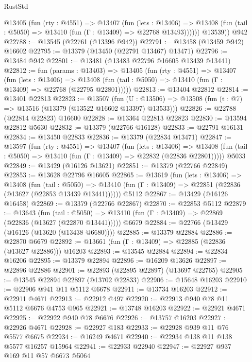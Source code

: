 \begin{lexlean}{RustStd}
\begin{coremodule}
          @13405
            (fun (rty : @4551) =>
            @13407
              (fun (lets : @13406) =>
              @13408 (fun (tail : @5050) => @13410 (fun (Γ : @13409) => @22768 @13493))))))
        @13539))
    @942
@22788 := @13545 (@22761 (@13396 @942))
@22791 := @13458 (@13459 @942) @16602
@22795 := @13379 (@13450 (@22791 @13467) @13471)
@22796 := @13484 @942
@22801 := @13481 (@13483 @22796 @16605 @13439 @13441)
@22812 := fun (params : @13403) =>
  @13405
    (fun (rty : @4551) =>
    @13407
      (fun (lets : @13406) =>
      @13408 (fun (tail : @5050) => @13410 (fun (Γ : @13409) => @22768 (@22795 @22801)))))
@22813 := @13404 @22812
@22814 := @13401 @22813
@22823 := @13507
    (fun (U : @13506) => @13508 (fun (t : @7) => @13516 (@13379 (@13522 @16602 @13397) @13533)))
@22826 := @22788 (@22814 @22823) @16600
@22828 := @13364 @22813 @22823
@22830 := @13594 @22812 @5630
@22832 := @13379 (@22766 @16128)
@22833 := @22791 @16131
@22834 := @13450 @22833
@22836 := @13379 (@22834 @13471)
@22847 := @13597
    (fun (rty : @4551) =>
    @13407
      (fun (lets : @13406) =>
      @13408 (fun (tail : @5050) => @13410 (fun (Γ : @13409) => @22832 (@22836 @22801)))))
    @5033
@22849 := @13429 (@16126 @13621)
@22851 := @13379 (@22766 @22849)
@22853 := @13628 @22796 @16605
@22865 := @13619
    (fun (lets : @13406) =>
    @13408
      (fun (tail : @5050) =>
      @13410 (fun (Γ : @13409) => @22851 (@22836 (@13627 (@22853 @13439 @13441))))))
    @5112
@22867 := @13429 (@16126 @16458)
@22869 := @13379 (@22766 @22867)
@22870 := @22853 @5112
@22879 := @13643
    (fun (tail : @5050) => @13410 (fun (Γ : @13409) => @22869 (@22836 (@13627 (@22870 @13441)))))
    @6679
@22884 := @22766 (@13429 (@16126 (@13620 (@13438 @6680))))
@22885 := @13379 @22884
@22886 := @22870 @6679
@22892 := @13661 (fun (Γ : @13409) => @22885 (@22836 (@13627 @22886))) @16203
@22893 := @13545 @22884
@22894 := @22834 @16206
@22895 := @13379 @22894
@22896 := @16209 @13626
@22897 := @22896 @22886
@22901 := @22893 (@22895 @22897) (@13697 @22765)
@22905 := @13545 @22894 @22897 (@13702 @22833)
@22906 := @15648 @16203
@22910 := @22906 @941 @11 @5112 @6678
@22911 := @13734 @16203
@22912 := @22911 @4671
@22913 := @22912 @497
@22920 := @22913 @940 @78 @11 @5112 @6676 @4753 @965
@22921 := @13748 @16203
@22922 := @22921 @4671
@22925 := @22922 @940 @78 @6676
@22926 := @13757 @16203
@22927 := @22926 @4671
@22928 := @22927 @183
@22933 := @22928 @939 @11 @76 @5577 @6675
@22934 := @16249 @4671
@22940 := @22934 @138 @11 @138 @5577 @16257 @15964
@22941 := @22933 @22940
@22947 := @22927 @937 @169 @11 @57 @6673 @5064

\end{coremodule}
\end{lexlean}

